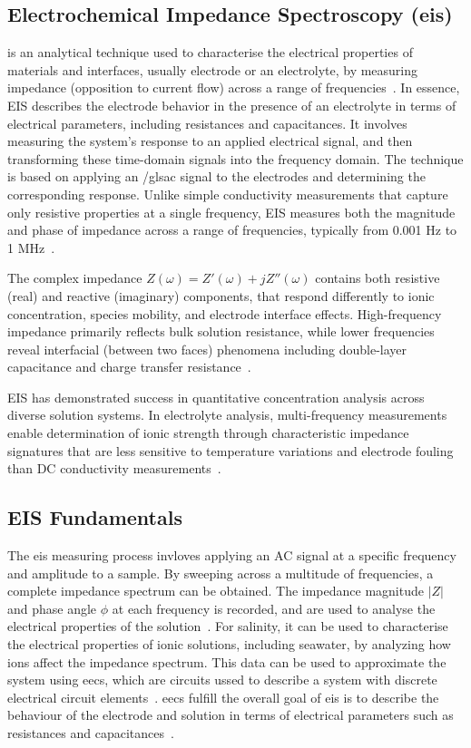 \subsection{Electrochemical Impedance Spectroscopy (\gls{eis})}

 is an analytical technique used to characterise the electrical properties of materials and interfaces, usually electrode or an electrolyte, by measuring impedance (opposition to current flow) across a range of frequencies~\cite{canales_electrochemical_2021}.
In essence, EIS describes the electrode behavior in the presence of an electrolyte in terms of electrical parameters, including resistances and capacitances.
It involves measuring the system's response to an applied electrical signal, and then transforming these time-domain signals into the frequency domain.
The technique is based on applying an /gls{ac} signal to the electrodes and determining the corresponding response.
Unlike simple conductivity measurements that capture only resistive properties at a single frequency, EIS measures both the magnitude and phase of impedance across a range of frequencies, typically from 0.001 Hz to 1 MHz~\cite{barsoukov_impedance_2005}.

The complex impedance $Z(\omega)=Z'(\omega)+jZ''(\omega)$ contains both resistive (real) and reactive (imaginary) components, that respond differently to ionic concentration, species mobility, and electrode interface effects.
High-frequency impedance primarily reflects bulk solution resistance, while lower frequencies reveal interfacial (between two faces) phenomena including double-layer capacitance and charge transfer resistance~\cite{orazem_electrochemical_2008}.

EIS has demonstrated success in quantitative concentration analysis across diverse solution systems.
In electrolyte analysis, multi-frequency measurements enable determination of ionic strength through characteristic impedance signatures that are less sensitive to temperature variations and electrode fouling than DC conductivity measurements~\cite{barsoukov_impedance_2005}.


\subsection{EIS Fundamentals}
The \gls{eis} measuring process invloves applying an AC signal at a specific frequency and amplitude to a sample.
By sweeping across a multitude of frequencies, a complete impedance spectrum can be obtained.
The impedance magnitude $|Z|$ and phase angle $\phi$ at each frequency is recorded, and are used to analyse the electrical properties of the solution~\cite{orazem_electrochemical_2008}.
For salinity, it can be used to characterise the electrical properties of ionic solutions, including seawater, by analyzing how ions affect the impedance spectrum. 
This data can be used to approximate the system using \glspl{eec}, which are circuits ussed to describe a system with discrete electrical circuit elements~\cite{barsoukov_impedance_2005}.
\glspl{eec} fulfill the overall goal of \gls{eis} is to describe the behaviour of the electrode and solution in terms of electrical parameters such as resistances and capacitances~\cite{canales_electrochemical_2021}.

